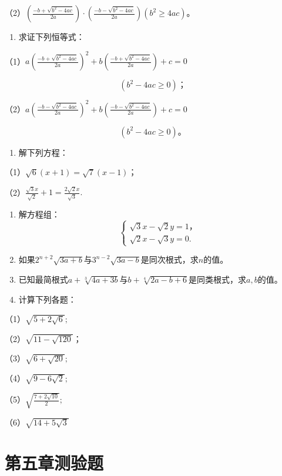 （2）\(\left(\frac{-b + \sqrt{b^2 - 4ac}}{2a}\right) \cdot \left(\frac{-b - \sqrt{b^2 - 4ac}}{2a}\right) (b^2 \geqslant 4ac)\)。

\begin{enumerate}[start=7]
\item
  求证下列恒等式：
\end{enumerate}

（1）\(a\left(\frac{-b + \sqrt{b^2 - 4ac}}{2a}\right)^2 + b\left(\frac{-b + \sqrt{b^2 - 4ac}}{2a}\right) + c = 0\)

\[
(b ^ {2} - 4 a c \geqslant 0)\text{；}
\]

（2）\(a\left(\frac{-b - \sqrt{b^2 - 4ac}}{2a}\right)^2 + b\left(\frac{-b - \sqrt{b^2 - 4ac}}{2a}\right) + c = 0\)

\[
(b ^ {2} - 4 a c \geqslant 0)\text{。}
\]

\begin{enumerate}[start=8]
\item
  解下列方程：
\end{enumerate}

（1）\(\sqrt{6} (x + 1) = \sqrt{7} (x - 1)\)；

（2）\(\frac{\sqrt{3}x}{\sqrt{2}} + 1 = \frac{2\sqrt{2}x}{\sqrt{3}}.\)

\begin{enumerate}[start=9]
\item
  解方程组：
\[
\left\{ \begin{array}{l} \sqrt {3} x - \sqrt {2} y = 1\text{，} \\ \sqrt {2} x - \sqrt {3} y = 0. \end{array} \right.
\]
\item
  如果\(2^{n+2}\sqrt{3a+b}\)与\(3^{n-2}\sqrt{3a-b}\)是同次根式，求\(n\)的值。
\item
  已知最简根式\(a + \sqrt[3]{4a + 3b}\)与\(b + \sqrt[4]{2a - b + 6}\)是同类根式，求\(a, b\)的值。
\item
  计算下列各题：
\end{enumerate}

（1）\(\sqrt{5 + 2\sqrt{6}};\)

（2）\(\sqrt{11 - \sqrt{120}}\)；

（3）\(\sqrt{6 + \sqrt{20}};\)

（4）\(\sqrt{9 - 6\sqrt{2}};\)

（5）\(\sqrt{\frac{7 + 2\sqrt{10}}{2}};\)

（6）\(\sqrt{14 + 5\sqrt{3}}\)

\section{第五章测验题}

